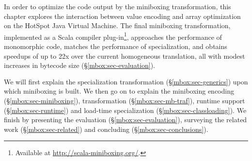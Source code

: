In order to optimize the code output by the miniboxing transformation, this chapter explores the interaction between value encoding and array optimization on the HotSpot Java Virtual Machine. The final miniboxing transformation, implemented as a Scala compiler plug-in\footnote{Available at \url{http://scala-miniboxing.org/}.}, approaches the performance of monomorphic code, matches the performance of specialization, and obtains speedups of up to 22x over the current homogeneous translation, all with modest increases in bytecode size (\S{}\ref{mbox:sec-evaluation}).

We will first explain the specialization transformation (\S\ref{mbox:sec-generics}) upon which miniboxing is built. We then go on to explain the miniboxing encoding (\S\ref{mbox:sec-miniboxing}), transformation (\S\ref{mbox:sec-mb-traf}), runtime support (\S\ref{mbox:sec-runtime}) and load-time specialization (\S\ref{mbox:sec-classloading}). We finish by presenting the evaluation (\S\ref{mbox:sec-evaluation}), surveying the related work (\S\ref{mbox:sec-related}) and concluding (\S\ref{mbox:sec-conclusions}).
